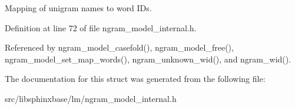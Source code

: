 Mapping of unigram names to word I\-Ds. 



Definition at line 72 of file ngram\-\_\-model\-\_\-internal.\-h.



Referenced by ngram\-\_\-model\-\_\-casefold(), ngram\-\_\-model\-\_\-free(), ngram\-\_\-model\-\_\-set\-\_\-map\-\_\-words(), ngram\-\_\-unknown\-\_\-wid(), and ngram\-\_\-wid().



The documentation for this struct was generated from the following file\-:\begin{DoxyCompactItemize}
\item 
src/libsphinxbase/lm/ngram\-\_\-model\-\_\-internal.\-h\end{DoxyCompactItemize}
